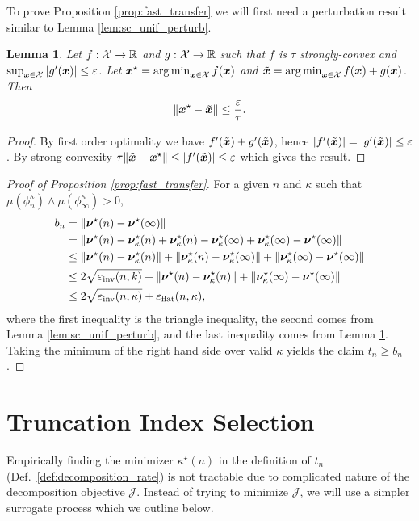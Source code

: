 \documentclass{article} %
\newtheorem{lemma}[theorem]{Lemma}
\newcommand{\bhp}{\bm{\nu}}                       %
\newcommand{\searchspace}{\mathcal{X}}            %
\newcommand{\growthconst}{\tau}
\newcommand{\hptrunc}{\kappa}
\newcommand{\epsinv}{\eps_{\mathrm{inv}}}
\newcommand{\epsflat}{\eps_{\mathrm{flat}}}
\newcommand{\decompobj}{\mathcal{J}}
\begin{document}
To prove Proposition \ref{prop:fast_transfer} we will first need a perturbation result similar to Lemma \ref{lem:sc_unif_perturb}.
\begin{lemma}\label{lem:sc_deriv_perturb}
    Let $f : \searchspace \to \R$ and $g : \searchspace \to \R$ such that $f$ is $\growthconst$ strongly-convex and $\sup_{\bx \in \searchspace} |g'(\bx)| \leq \varepsilon$. Let $\bx^\star = \argmin_{\bx \in \searchspace} f(\bx)$ and $\tilde{\bx} = \argmin_{\bx \in \searchspace} f(\bx) + g(\bx)$. Then
    \[
        \norm{\bx^\star - \tilde{\bx}} \leq \frac{\varepsilon}{\growthconst}.
    \]
\end{lemma}
\begin{proof}
    By first order optimality we have $f'(\tilde{{\boldsymbol x}}) + g'(\tilde{{\boldsymbol x}})$, hence $|f'(\tilde{{\boldsymbol x}})| = |g'(\tilde{{\boldsymbol x}})| \leq \varepsilon$. By strong convexity $\growthconst \norm{\tilde{\bx} - \bx^\star} \leq |f'(\tilde{\bx})| \leq \varepsilon$ which gives the result.
\end{proof}
\begin{proof}[Proof of Proposition \ref{prop:fast_transfer}]
    For a given $n$ and $\hptrunc$ such that $\mu(\phi_n^\hptrunc) \wedge \mu(\phi_\infty^\hptrunc) > 0$,
    \begin{align*}
        b_n &= \norm{\bhp^\star(n) - \bhp^\star(\infty)}\\
        &=  \norm{\bhp^\star(n) - \bhp^\star_{\hptrunc}(n) + \bhp^\star_{\hptrunc}(n) - \bhp^\star_{\hptrunc}(\infty) + \bhp^\star_{\hptrunc}(\infty) - \bhp^\star(\infty)}\\
        &\leq  \norm{\bhp^\star(n) - \bhp^\star_{\hptrunc}(n)}  + \norm{\bhp^\star_{\hptrunc}(n) - \bhp^\star_{\hptrunc}(\infty)} + \norm{\bhp^\star_{\hptrunc}(\infty) - \bhp^\star(\infty)}\\
        &\leq 2 \sqrt{\epsinv(n, k)} + \norm{\bhp^\star(n) - \bhp^\star_{\hptrunc}(n)}  + \norm{\bhp^\star_{\hptrunc}(\infty) - \bhp^\star(\infty)}\\
        &\leq 2 \sqrt{\epsinv(n, \hptrunc)} + \epsflat(n, \hptrunc),
    \end{align*}
    where the first inequality is the triangle inequality, the second comes from Lemma \ref{lem:sc_unif_perturb}, and the last inequality comes from Lemma \ref{lem:sc_deriv_perturb}. Taking the minimum of the right hand side over valid $\hptrunc$ yields the claim $t_n \geq b_n$.
\end{proof}

\newpage
\section{Truncation Index Selection}\label{app:selection_process}
Empirically finding the minimizer $\hptrunc^\star(n)$ in the definition of $t_n$ (Def.\ \ref{def:decomposition_rate}) is not tractable due to complicated nature of the decomposition objective $\decompobj$. Instead of trying to minimize $\decompobj$, we will use a simpler surrogate process which we outline below. 
\end{document}
